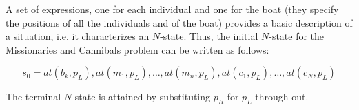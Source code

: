 \documentclass[]{report}
\begin{document}
A set of expressions, one for each individual and one for the boat (they specify the positions of all the individuals and of the boat) provides a basic description of a situation, i.e. it characterizes an $N$-state. Thus, the initial $N$-state for the Missionaries and Cannibals problem can be written as follows:

\begin{displaymath}
s_0 = at(b_k,p_L),at(m_1,p_L),\dots,at(m_n,p_L),at(c_1,p_L),\dots,at(c_N,p_L)
\end{displaymath}

The terminal $N$-state is attained by substituting $p_R$ for $p_L$ through-out.
\end{document}
